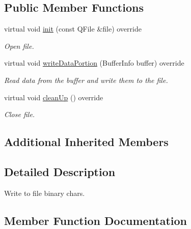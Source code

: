 \subsection*{Public Member Functions}
\begin{DoxyCompactItemize}
\item 
virtual void \hyperlink{classBinaryTransmissionWriter_a40cc3d88d6501af5db2ed2acd05caacc}{init} (const Q\+File \&file) override
\begin{DoxyCompactList}\small\item\em Open file. \end{DoxyCompactList}\item 
virtual void \hyperlink{classBinaryTransmissionWriter_aaeee88a165c1a53ef89849c08df6a5e1}{write\+Data\+Portion} (Buffer\+Info buffer) override
\begin{DoxyCompactList}\small\item\em Read data from the buffer and write them to the file. \end{DoxyCompactList}\item 
\mbox{\label{classBinaryTransmissionWriter_ad30e89ab71e1317464fedc4671f2da86}} 
virtual void \hyperlink{classBinaryTransmissionWriter_ad30e89ab71e1317464fedc4671f2da86}{clean\+Up} () override
\begin{DoxyCompactList}\small\item\em Close file. \end{DoxyCompactList}\end{DoxyCompactItemize}
\subsection*{Additional Inherited Members}


\subsection{Detailed Description}
Write to file binary chars. 

\subsection{Member Function Documentation}
\mbox{\label{classBinaryTransmissionWriter_a40cc3d88d6501af5db2ed2acd05caacc}} 

